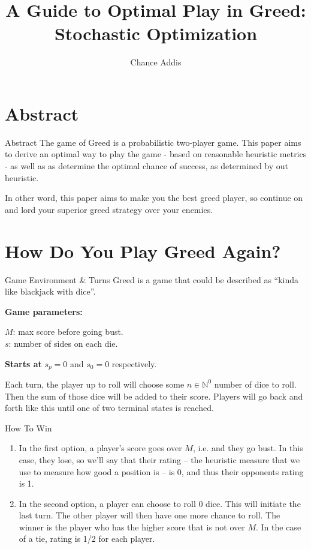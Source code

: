 \documentclass{beamer}
\title{A Guide to Optimal Play in Greed: Stochastic Optimization}
\author{Chance Addis}
\affil{Department of Mathematics and Statistics, Reed College}
\begin{document}
\maketitle

\section{Abstract}
\begin{frame}{Abstract}
    The game of Greed is a probabilistic two-player game. This paper aims to derive an optimal way to play the game - based on reasonable heuristic metrics - as well as as determine the optimal chance of success, as determined by out heuristic. 

    In other word, this paper aims to make you the best greed player, so continue on and lord your superior greed strategy over your enemies. 
\end{frame}

\section{How Do You Play Greed Again?}
\begin{frame}{Game Environment \& Turns}
    Greed is a game that could be described as ``kinda like blackjack with dice''.

    \textbf{Game parameters:}
    
    $M$: max score before going bust. \\
    $s$: number of sides on each die.

    \textbf{Starts at}
    $s_p = 0$ and $s_0 = 0$ respectively.

    Each turn, the player up to roll will choose some $n \in \mathbb{N}^0$ number of dice to roll. Then the sum of those dice will be added to their score. Players will go back and forth like this until one of two terminal states is reached.
\end{frame}

\begin{frame}{How To Win}
    \begin{enumerate}
        \item In the first option, a player's score goes over $M$, i.e. and they go bust. In this case, they lose, so we'll say that their rating -- the heuristic measure that we use to measure how good a position is -- is 0, and thus their opponents rating is 1. 
        \item In the second option, a player can choose to roll 0 dice. This will initiate the last turn. The other player will then have one more chance to roll. The winner is the player who has the higher score that is not over $M$. In the case of a tie, rating is 1/2 for each player. 
    \end{enumerate}
\end{frame}
\end{document}
